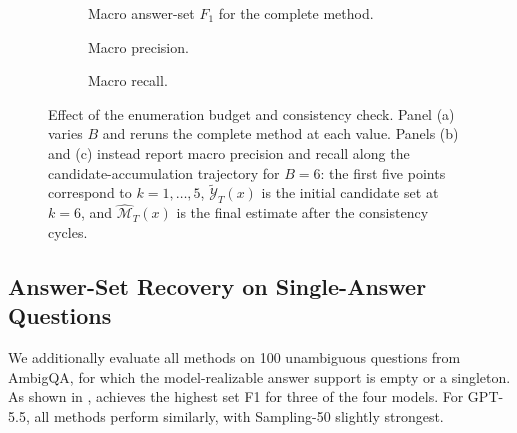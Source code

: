 \begin{figure}[t]
    \centering
    \begin{subfigure}[t]{0.98\textwidth}
        \centering
        \resizebox{\linewidth}{!}{%
        }
        \caption{Macro answer-set \(F_1\) for the complete \circleclar{} method.}
        \label{fig:enumeration-budget-f1}
    \end{subfigure}

    \medskip

    \begin{subfigure}[t]{0.98\textwidth}
        \centering
        \resizebox{\linewidth}{!}{%
        }
        \caption{Macro precision.}
        \label{fig:enumeration-budget-precision}
    \end{subfigure}

    \medskip

    \begin{subfigure}[t]{0.98\textwidth}
        \centering
        \resizebox{\linewidth}{!}{%
        }
        \caption{Macro recall.}
        \label{fig:enumeration-budget-recall}
    \end{subfigure}

    \caption{Effect of the enumeration budget and consistency check. Panel (a) varies \(B\) and reruns the complete \circleclar{} method at each value. Panels (b) and (c) instead report macro precision and recall along the candidate-accumulation trajectory for \(B=6\): the first five points correspond to \(k=1,\ldots,5\), \(\widetilde{\mathcal{Y}}_T(x)\) is the initial candidate set at \(k=6\), and \(\widehat{\mathcal{M}}_T(x)\) is the final estimate after the consistency cycles.}
    \label{fig:enumeration-budget-ablation}
\end{figure}

\subsection{Answer-Set Recovery on Single-Answer Questions}
\label{app:single-answer-qa}

We additionally evaluate all methods on 100 unambiguous questions from AmbigQA, for which the model-realizable answer support is empty or a singleton. As shown in , \circleclar{} achieves the highest set F1 for three of the four models. For GPT-5.5, all methods perform similarly, with Sampling-50 slightly
strongest.

